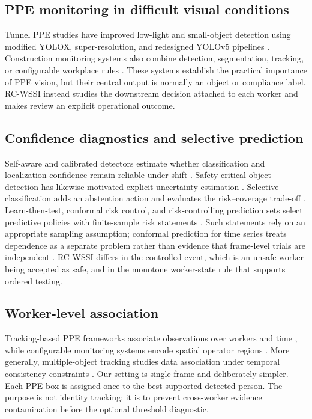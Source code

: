 \documentclass[iicol,pdflatex,sn-mathphys-num]{sn-jnl}
\begin{document}
\subsection{PPE monitoring in difficult visual conditions}

Tunnel PPE studies have improved low-light and small-object detection using modified YOLOX, super-resolution, and redesigned YOLOv5 pipelines \cite{wang2023lowlight,malaikrisanachalee2025espcn,wu2025enhanced}. Construction monitoring systems also combine detection, segmentation, tracking, or configurable workplace rules \cite{lee2023monitoring,pisu2024workplace}. These systems establish the practical importance of PPE vision, but their central output is normally an object or compliance label. RC-WSSI instead studies the downstream decision attached to each worker and makes review an explicit operational outcome.

\subsection{Confidence diagnostics and selective prediction}

Self-aware and calibrated detectors estimate whether classification and localization confidence remain reliable under shift \cite{oksuz2023selfaware,pathiraja2023multiclass}. Safety-critical object detection has likewise motivated explicit uncertainty estimation \cite{le2018uncertainty}. Selective classification adds an abstention action and evaluates the risk--coverage trade-off \cite{geifman2017selective}. Learn-then-test, conformal risk control, and risk-controlling prediction sets select predictive policies with finite-sample risk statements \cite{angelopoulos2021learntest,angelopoulos2022conformal,bates2021risk}. Such statements rely on an appropriate sampling assumption; conformal prediction for time series treats dependence as a separate problem rather than evidence that frame-level trials are independent \cite{xu2023timeseries}. RC-WSSI differs in the controlled event, which is an unsafe worker being accepted as safe, and in the monotone worker-state rule that supports ordered testing.

\subsection{Worker-level association}

Tracking-based PPE frameworks associate observations over workers and time \cite{lee2023monitoring}, while configurable monitoring systems encode spatial operator regions \cite{pisu2024workplace}. More generally, multiple-object tracking studies data association under temporal consistency constraints \cite{rakai2022association}. Our setting is single-frame and deliberately simpler. Each PPE box is assigned once to the best-supported detected person. The purpose is not identity tracking; it is to prevent cross-worker evidence contamination before the optional threshold diagnostic.
\end{document}
